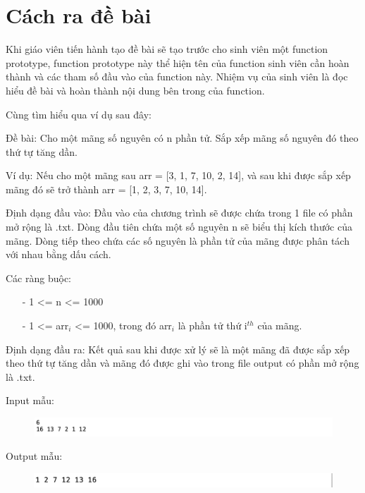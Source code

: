 \documentclass[12pt,a4paper]{report}
\begin{document}
\section{Cách ra đề bài}
Khi giáo viên tiến hành tạo đề bài sẽ tạo trước cho sinh viên một function prototype, function prototype này thể hiện tên của function sinh viên cần hoàn thành và các tham số đầu vào của function này. Nhiệm vụ của sinh viên là đọc hiểu đề bài và hoàn thành nội dung bên trong của function.

Cùng tìm hiểu qua ví dụ sau đây:

Đề bài: Cho một mãng số nguyên có n phần tử. Sắp xếp mãng số nguyên đó theo thứ tự tăng dần.

Ví dụ: Nếu cho một mãng sau arr = [3, 1, 7, 10, 2, 14], và sau khi được sắp xếp mãng đó sẽ trở thành arr = [1, 2, 3, 7, 10, 14].

Định dạng đầu vào: Đầu vào của chương trình sẽ được chứa trong 1 file có phần mở rộng là .txt. Dòng đầu tiên chứa một số nguyên n sẽ biểu thị kích thước của mãng. Dòng tiếp theo chứa các số nguyên là phần tử của mãng được phân tách với nhau bằng dấu cách.

Các ràng buộc:

\begin{itemize}
\item[-] 1 <= n <= 1000
\item[-] 1 <= arr$_{i}$  <= 1000, trong đó arr$_{i}$ là phần tử thứ i$^{th}$ của mãng.
\end{itemize}

Định dạng đầu ra: Kết quả sau khi được xử lý sẽ là một mãng đã được sắp xếp theo thứ tự tăng dần và mãng đó được ghi vào trong file output có phần mở rộng là .txt.

Input mẫu:

\begin{figure}[ht]
\begin{center}
\includegraphics[scale=.3]{hinhanh/inputsample.png}
\end{center}
\end{figure}

Output mẫu:

\begin{figure}[ht]
\begin{center}
\includegraphics[scale=0.4]{hinhanh/outputsample.png}
\end{center}
\end{figure}
\end{document}
